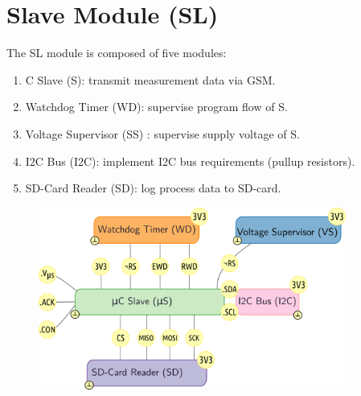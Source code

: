 
\section{Slave Module (SL)}
\label{sec:SL}

The SL module is composed of five modules:

\begin{enumerate}
    \item \mu C Slave (\mu S): transmit measurement data via GSM.
    \item Watchdog Timer (WD): supervise program flow of \mu S.
    \item Voltage Supervisor (SS) : supervise supply voltage of \mu S.
    \item I2C Bus (I2C): implement I2C bus requirements (pullup resistors).
    \item SD-Card Reader (SD): log process data to SD-card.
\end{enumerate}

\begin{figure}[h]
    \centering
    \includegraphics[width=0.9\textwidth]{SL/SL}
\end{figure}



\clearpage




\clearpage

\clearpage